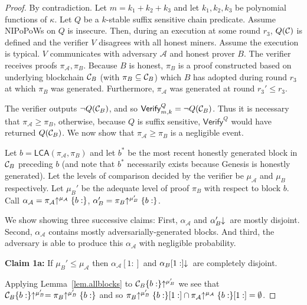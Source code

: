 \begin{proof}
    By contradiction. Let $m = k_1 + k_2 + k_3$ and let $k_1, k_2, k_3$ be
    polynomial functions of $\kappa$. Let $Q$ be a $k$-stable suffix sensitive
    chain predicate. Assume NIPoPoWs on $Q$ is insecure. Then, during an
    execution at some round $r_3$, $Q(\mathcal{C})$ is defined and the verifier $V$
    disagrees with all honest miners. Assume the execution is typical. $V$
    communicates with adversary $\mathcal{A}$ and honest prover $B$.  The
    verifier receives proofs $\pi_\mathcal{A}, \pi_B$. Because $B$ is honest,
    $\pi_B$ is a proof constructed based on underlying blockchain $\mathcal{C}_B$
    (with $\pi_B \subseteq \mathcal{C}_B$) which $B$ has adopted during round $r_3$
    at which $\pi_B$ was generated. Furthermore, $\pi_\mathcal{A}$ was generated
    at round $r_3' \leq r_3$.

    The verifier outputs $\lnot Q(\mathcal{C}_B)$, and so
    $\textsf{Verify}^Q_{m,k} = \lnot Q(\mathcal{C}_B)$. Thus it is necessary that
    $\pi_\mathcal{A} \geq \pi_B$, otherwise, because $Q$
    is suffix sensitive, $\textsf{Verify}^Q$ would have returned $Q(\mathcal{C}_B)$.
    We now show that $\pi_\mathcal{A} \geq \pi_B$ is a negligible event.

    Let $b = \textsf{LCA}(\pi_\mathcal{A}, \pi_B)$ and let $b^*$ be
    the most recent honestly generated block in $\mathcal{C}_B$ preceding $b$ (and
    note that $b^*$ necessarily exists because Genesis is honestly generated).
    Let the levels of comparison decided by the verifier be $\mu_\mathcal{A}$
    and $\mu_B$ respectively.
    Let $\mu_B'$ be the adequate level of proof $\pi_B$ with respect to block
    $b$. Call $\alpha_\mathcal{A} =
    \pi_\mathcal{A}\negthickspace\uparrow^{\mu_\mathcal{A}}\{b:\}$,
    $\alpha'_B = \pi_B\negthickspace\uparrow^{\mu_B'}\{b:\}$.

    We show showing three successive claims: First, $\alpha_\mathcal{A}$ and
    $\alpha'_B\negthickspace\downarrow\,$ are mostly disjoint. Second, $\alpha_\mathcal{A}$
    contains mostly adversarially-generated blocks. And third, the adversary is
    able to produce this $\alpha_\mathcal{A}$ with negligible probability.

    \textbf{Claim 1a: } If $\mu_B' \leq \mu_\mathcal{A}$ then
    $\alpha_\mathcal{A}[1:]$ and $\alpha_B[1:]\negthickspace\downarrow\,$ are completely
    disjoint.

    Applying Lemma~\ref{lem.allblocks}
    to $\mathcal{C}_B\{b:\}\negthickspace\uparrow^{\mu_B'}$ we see that
    $\mathcal{C}_B\{b:\}\negthickspace\uparrow^{\mu_B'} = \pi_B\negthickspace\uparrow^{\mu_B'}\{b:\}$ and so
    $\pi_B\negthickspace\uparrow^{\mu_B'}\{b:\}[1:] \cap
    \pi_\mathcal{A}\negthickspace\uparrow^{\mu_\mathcal{A}}\{b:\}[1:] = \emptyset$.


\end{proof}
